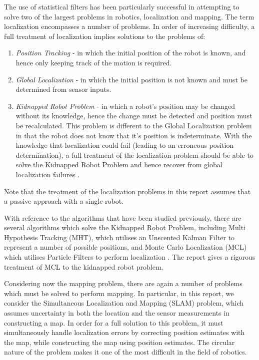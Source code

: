 \documentclass[english]{article}
\begin{document}
The use of statistical filters has been particularly successful in attempting to solve two of the largest problems in robotics, localization and mapping. The term localization encompasses a number of problems. In order of increasing difficulty, a full treatment of localization implies solutions to the problems of:
\begin{enumerate}
 \item \emph{Position Tracking} - in which the initial position of the robot is known, and hence only keeping track of the motion is required.
 \item \emph{Global Localization} - in which the initial position is not known and must be determined from sensor inputs.
 \item \emph{Kidnapped Robot Problem} - in which a robot's position may be changed without its knowledge, hence the change must be detected and position must be recalculated. This problem is different to the Global Localization problem in that the robot does not know that it's position is indeterminate. With the knowledge that localization could fail (leading to an erroneous position determination), a full treatment of the localization problem should be able to solve the Kidnapped Robot Problem and hence recover from global localization failures \cite[pp 193-196]{probrob}.
\end{enumerate}

Note that the treatment of the localization problems in this report assumes that a passive approach with a single robot.

With reference to the algorithms that have been studied previously, there are several algorithms which solve the Kidnapped Robot Problem, including Multi Hypothesis Tracking (MHT), which utilises an Unscented Kalman Filter to represent a number of possible positions, and Monte Carlo Localization (MCL) which utilises Particle Filters to perform localization \cite[pp 274]{probrob}. The report gives a rigorous treatment of MCL to the kidnapped robot problem.

Considering now the mapping problem, there are again a number of problems which must be solved to perform mapping. In particular, in this report, we consider the Simultaneous Localization and Mapping (SLAM) problem, which assumes uncertainty in both the location and the sensor measurements in constructing a map. In order for a full solution to this problem, it must simultaneously handle localization errors by correcting position estimates with the map, while constructing the map using position estimates. The circular nature of the problem makes it one of the most difficult in the field of robotics.
\end{document}
